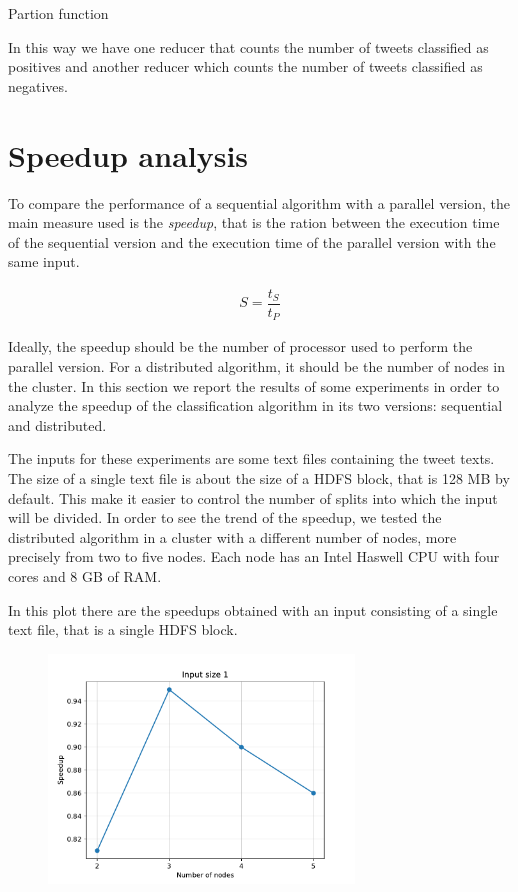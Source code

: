 \documentclass[10pt,twocolumn,letterpaper]{article}
\begin{document}
\begin{algorithm}[H]
\label{PartitionFunction}
\caption{Partion function}
\begin{algorithmic}

        \State {}
        \State {}
    \Else
        \State {} 
    \EndIf

\end{algorithmic}
\end{algorithm}

In this way we have one reducer that counts the number of tweets classified as positives and another reducer which counts the number of tweets classified as negatives.

\section{Speedup analysis}

To compare the performance of a sequential algorithm with a parallel version, the main measure used is the \textit{speedup}, that is the ration between the execution time of the sequential version and the execution time of the parallel version with the same input.

\begin{align}
S = \dfrac{t_S}{t_P}
\end{align}

Ideally, the speedup should be the number of processor used to perform the parallel version. For a distributed algorithm, it should be the number of nodes in the cluster. In this section we report the results of some experiments in order to analyze the speedup of the classification algorithm in its two versions: sequential and distributed.

The inputs for these experiments are some text files containing the tweet texts. The size of a single text file is about the size of a HDFS block, that is 128 MB by default. This make it easier to control the number of splits into which the input will be divided. In order to see the trend of the speedup, we tested the distributed algorithm in a cluster with a different number of nodes, more precisely from two to five nodes. Each node has an Intel Haswell CPU with four cores and 8 GB of RAM.

In this plot there are the speedups obtained with an input consisting of a single text file, that is a single HDFS block.

\begin{figure}[H]
\centering
\includegraphics[width=3.2in]{fig/speedup1}
\end{figure}
\end{document}
